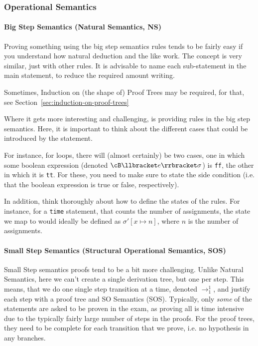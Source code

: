 \subsubsection{Operational Semantics}
\paragraph{Big Step Semantics (Natural Semantics, NS)}
Proving something using the big step semantics rules tends to be fairly easy if you understand how natural deduction and the like work.
The concept is very similar, just with other rules. It is advisable to name each sub-statement in the main statement, to reduce the required amount writing.

Sometimes, Induction on (the shape of) Proof Trees may be required, for that, see Section~\ref{sec:induction-on-proof-trees}

Where it gets more interesting and challenging, is providing rules in the big step semantics.
Here, it is important to think about the different cases that could be introduced by the statement.

For instance, for loops, there will (almost certainly) be two cases, one in which some boolean expression (denoted $\cB \llbracket e \rrbracket \sigma$) is \texttt{ff},
the other in which it is \texttt{tt}.
For these, you need to make sure to state the side condition (i.e. that the boolean expression is true or false, respectively).

In addition, think thoroughly about how to define the states of the rules. For instance, for a \texttt{time} statement, that counts the number of assignments,
the state we map to would ideally be defined as $\sigma' [x \mapsto n]$, where $n$ is the number of assignments.


\paragraph{Small Step Semantics (Structural Operational Semantics, SOS)}
Small Step semantics proofs tend to be a bit more challenging. Unlike Natural Semantics, here we can't create a single derivation tree, but one per step.
This means, that we do one single step transition at a time, denoted $\rightarrow_1^1$, and justify each step with a proof tree and SO Semantics (SOS).
Typically, only \textit{some} of the statements are asked to be proven in the exam, as proving all is time intensive due to the typically fairly
large number of steps in the proofs.
For the proof trees, they need to be complete for each transition that we prove, i.e. no hypothesis in any branches.

